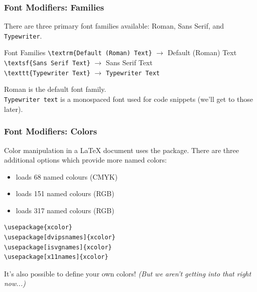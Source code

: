 \begin{frame}[fragile]
\frametitle{Font Modifiers: Families}
There are three primary font families available: \textrm{Roman}, \textsf{Sans Serif}, and \texttt{Typewriter}. \pause
\begin{block}{Font Families}
    \verb|\textrm{Default (Roman) Text}| $\to$ \textrm{Default (Roman) Text} \\ \pause
    \vspace{0.2cm}
    \verb|\textsf{Sans Serif Text}| $\to$ \textsf{Sans Serif Text} \\ \pause
    \vspace{0.2cm}
    \verb|\texttt{Typewriter Text}| $\to$ \texttt{Typewriter Text} \\ \pause
    \vspace{0.2cm}
\end{block}
\textrm{Roman} is the default font family. \\ \pause
\texttt{Typewriter text} is a monospaced font used for code snippets (we'll get to those later).
\end{frame}


\begin{frame}[fragile]
\frametitle{Font Modifiers: Colors}
Color manipulation in a \LaTeX{} document uses the  package. There are three additional options which provide more named colors: \pause
\begin{itemize}
    \item {} loads 68 named colours (CMYK)
    \item {} loads 151 named colours (RGB)
    \item {} loads 317 named colours (RGB) 
\end{itemize} \pause
\begin{exampleblock}{}
\begin{verbatim}
\usepackage{xcolor}
\usepackage[dvipsnames]{xcolor}
\usepackage[isvgnames]{xcolor}
\usepackage[x11names]{xcolor}
\end{verbatim}
\end{exampleblock} \pause
It's also possible to define your own colors! \textit{(But we aren't getting into that right now...)}
\end{frame}


